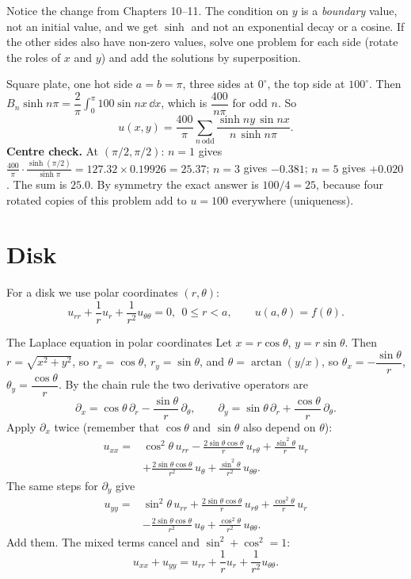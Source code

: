 Notice the change from Chapters 10--11. The condition on $y$ is a \emph{boundary} value, not an initial value, and we get $\sinh$ and not an exponential decay or a cosine. If the other sides also have non-zero values, solve one problem for each side (rotate the roles of $x$ and $y$) and add the solutions by superposition.

\begin{examplebox}{Square plate, one hot side}
$a=b=\pi$, three sides at $0^\circ$, the top side at $100^\circ$. Then $B_n\sinh n\pi = \dfrac2\pi\displaystyle\int_0^\pi100\sin nx\,\dd x$, which is $\dfrac{400}{n\pi}$ for odd $n$. So
\[ u(x,y) = \frac{400}{\pi}\sum_{n\ \text{odd}}\frac{\sinh ny\,\sin nx}{n\,\sinh n\pi}. \]
\textbf{Centre check.} At $(\pi/2,\pi/2)$: $n=1$ gives $\frac{400}{\pi}\cdot\frac{\sinh(\pi/2)}{\sinh\pi} = 127.32\times0.19926 = 25.37$; $n=3$ gives $-0.381$; $n=5$ gives $+0.020$. The sum is $25.0$. By symmetry the exact answer is $100/4=25$, because four rotated copies of this problem add to $u=100$ everywhere (uniqueness). \checkmark
\end{examplebox}

\section{Disk}

For a disk we use polar coordinates $(r,\theta)$:
\[ u_{rr} + \frac1ru_r + \frac1{r^2}u_{\theta\theta} = 0,\ \ 0\le r<a,\qquad u(a,\theta) = f(\theta). \]

\begin{derivbox}{The Laplace equation in polar coordinates}
Let $x = r\cos\theta$, $y = r\sin\theta$. Then $r = \sqrt{x^2+y^2}$, so $r_x = \cos\theta$, $r_y = \sin\theta$, and $\theta = \arctan(y/x)$, so $\theta_x = -\dfrac{\sin\theta}{r}$, $\theta_y = \dfrac{\cos\theta}{r}$. By the chain rule the two derivative operators are
\[ \partial_x = \cos\theta\,\partial_r - \frac{\sin\theta}{r}\,\partial_\theta,\qquad \partial_y = \sin\theta\,\partial_r + \frac{\cos\theta}{r}\,\partial_\theta. \]
Apply $\partial_x$ twice (remember that $\cos\theta$ and $\sin\theta$ also depend on $\theta$):
\[ \begin{aligned}u_{xx} = {}& \cos^2\theta\,u_{rr} - \frac{2\sin\theta\cos\theta}{r}\,u_{r\theta} + \frac{\sin^2\theta}{r}\,u_r \\ & + \frac{2\sin\theta\cos\theta}{r^2}\,u_\theta + \frac{\sin^2\theta}{r^2}\,u_{\theta\theta}.\end{aligned} \]
The same steps for $\partial_y$ give
\[ \begin{aligned}u_{yy} = {}& \sin^2\theta\,u_{rr} + \frac{2\sin\theta\cos\theta}{r}\,u_{r\theta} + \frac{\cos^2\theta}{r}\,u_r \\ & - \frac{2\sin\theta\cos\theta}{r^2}\,u_\theta + \frac{\cos^2\theta}{r^2}\,u_{\theta\theta}.\end{aligned} \]
Add them. The mixed terms cancel and $\sin^2+\cos^2 = 1$:
\[ u_{xx} + u_{yy} = u_{rr} + \frac1ru_r + \frac1{r^2}u_{\theta\theta}. \]
\end{derivbox}

